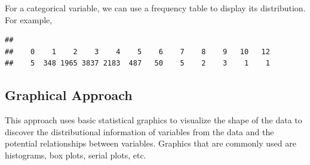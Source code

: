 \documentclass[
]{book}
\newenvironment{Shaded}{\begin{snugshade}}{\end{snugshade}}
\newcommand{\AttributeTok}[1]{\textcolor[rgb]{0.13,0.29,0.53}{#1}}
\newcommand{\ConstantTok}[1]{\textcolor[rgb]{0.56,0.35,0.01}{#1}}
\newcommand{\DecValTok}[1]{\textcolor[rgb]{0.00,0.00,0.81}{#1}}
\newcommand{\FunctionTok}[1]{\textcolor[rgb]{0.13,0.29,0.53}{\textbf{#1}}}
\newcommand{\NormalTok}[1]{#1}
\newcommand{\OtherTok}[1]{\textcolor[rgb]{0.56,0.35,0.01}{#1}}
\newcommand{\SpecialCharTok}[1]{\textcolor[rgb]{0.81,0.36,0.00}{\textbf{#1}}}
\newcommand{\StringTok}[1]{\textcolor[rgb]{0.31,0.60,0.02}{#1}}
\begin{document}
For a categorical variable, we can use a frequency table to display its distribution. For example,

\begin{Shaded}
\end{Shaded}

\begin{verbatim}
## 
##    0    1    2    3    4    5    6    7    8    9   10   12 
##    5  348 1965 3837 2183  487   50    5    2    3    1    1
\end{verbatim}

\hypertarget{graphical-approach}{%
\subsection{Graphical Approach}\label{graphical-approach}}

This approach uses basic statistical graphics to visualize the shape of the data to discover the distributional information of variables from the data and the potential relationships between variables. Graphics that are commonly used are histograms, box plots, serial plots, etc.

\begin{Shaded}
\end{Shaded}
\end{document}

